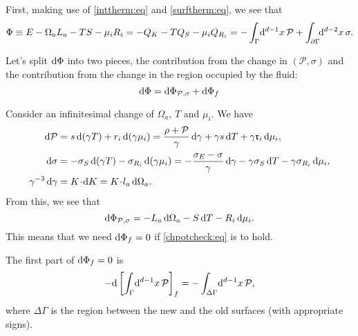 \documentclass[12pt]{article}
\newcommand{\ploc}{\mathcal{P}}
\newcommand{\rl}{\mathfrak{r}}
\newcommand{\mg}{\mu}
\newcommand{\vint}{\int_\Gamma\!\dr^{d-1}x}
\newcommand{\aint}{\int_{\p\Gamma}\!\!\dr^{d-2}x}
\newcommand{\dvint}{\int_{\Delta\Gamma}\!\dr^{d-1}x}
\begin{document}
First, making use of \eqref{inttherm:eq} and \eqref{surftherm:eq}, we see that
%
\begin{equation}\label{thermpot:eq}
  \Phi \equiv E -\Omega_a L_a - T S - \mg_i R_i = -Q_K - T Q_S - \mg_i Q_{R_i}
   = - \vint\,\ploc + \aint\,\sigma.
\end{equation}
%

Let's split $\mathrm{d}\Phi$ into two pieces, the contribution from the change in $(\ploc,\sigma)$ and the contribution from  the change in the region occupied by the fluid:
%
\begin{equation*}
  \dr\Phi = \dr\Phi_{\ploc,\sigma} + \dr\Phi_f
\end{equation*}
%

Consider an infinitesimal change of $\Omega_a$, $T$ and $\mg_i$. We have
%
\begin{equation*}
\begin{split}
  \dr \ploc &= s\,\dr(\gamma T) + r_i\,\dr(\gamma\mg_i) = \frac{\rho+\ploc}{\gamma}\,\dr\gamma + \gamma s\,\dr T +\gamma  \rl_i\,\dr\mg_i,\\
  \dr \sigma &= -\sigma_S\,\dr(\gamma T) - \sigma_{R_i}\,\dr(\gamma\mg_i) = -\frac{\sigma_E-\sigma}{\gamma}\,\dr\gamma - \gamma \sigma_S\,\dr T -\gamma \sigma_{R_i}\,\dr\mg_i,\\
  \gamma^{-3}\,\dr\gamma &= K\cdt\dr K = K\cdt l_a \,\dr\Omega_a.
\end{split}
\end{equation*}
%
From this, we see that
%
\begin{equation*}
  \dr\Phi_{\ploc,\sigma} = - L_a \,\dr \Omega_a - S \,\dr T - R_i \,\dr \mg_i.
\end{equation*}
%
This means that we need $\mathrm{d}\Phi_f=0$ if \eqref{chpotcheck:eq} is to hold.

The first part of $\mathrm{d}\Phi_f=0$ is
%
\begin{equation*}
  -\dr\brk{\vint\,\ploc}_f = -\dvint\,\ploc,
\end{equation*}
%
where $\Delta\Gamma$ is the region between the new and the old surfaces (with appropriate signs).
\end{document}
